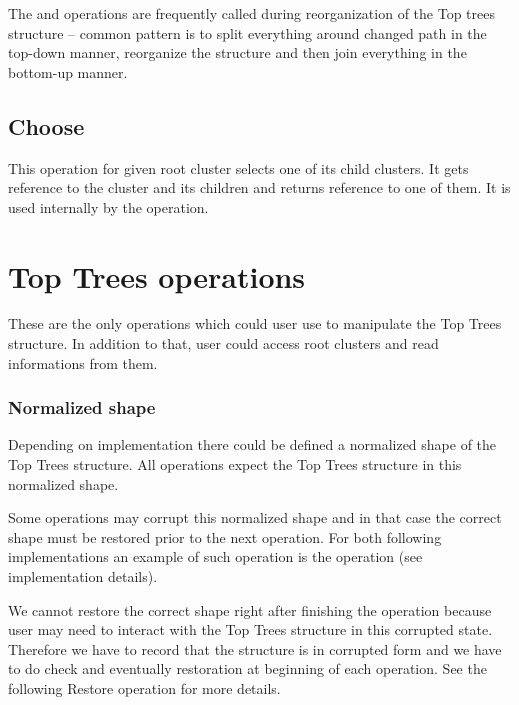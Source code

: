 The \Join{} and \Split{} operations are frequently called during reorganization of the
Top trees structure -- common pattern is to split everything around changed path
in the top-down manner, reorganize the structure and then join everything in the
bottom-up manner.

\subsection{\sc Choose}


This operation for given root cluster selects one of its child clusters. It gets
reference to the cluster and its children and returns reference to one of them.
It is used internally by the \Search{} operation.



\section{Top Trees operations}

These are the only operations which could user use to manipulate the Top Trees
structure. In addition to that, user could access root clusters and read
informations from them.

\subsubsection{Normalized shape}

Depending on implementation there could be defined a normalized shape of the
Top Trees structure. All operations expect the Top Trees structure in this
normalized shape.

Some operations may corrupt this normalized shape and in that case the correct
shape must be restored prior to the next operation. For both following
implementations an example of such operation is the \Expose{} operation (see
implementation details).

We cannot restore the correct shape right after finishing the operation because
user may need to interact with the Top Trees structure in this corrupted state.
Therefore we have to record that the structure is in corrupted form and we have
to do check and eventually restoration at beginning of each operation. See the
following {\I Restore} operation for more details.

